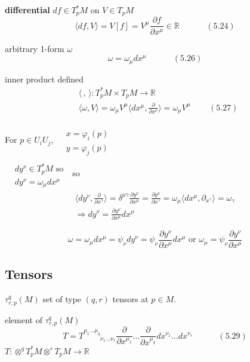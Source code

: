 \documentclass{book}
\begin{document}
\textbf{ differential } $df \in T_p^*M$ on $V \in T_pM$
\[
\langle df , V \rangle = V[f] = V^{\mu} \frac{ \partial f}{ \partial x^{\mu} } \in \mathbb{R} \quad \quad \quad \, (5.24)
\]

arbitrary 1-form $\omega$
\[
\omega = \omega_{\mu} dx^{\mu} \quad \quad \quad \, (5.26)
\]

inner product defined
\[
\begin{aligned}
  & \langle \, , \, \rangle : T_p^*M \times T_pM \to \mathbb{R} \\
  & \langle \omega, V \rangle = \omega_{\mu} V^{\mu} \langle dx^{\mu}, \frac{ \partial}{ \partial x^{\nu} } \rangle = \omega_{\mu} V^{\mu} \quad \quad \, (5.27) 
\end{aligned}
\]

For $p \in U_iU_j$, $\begin{aligned} & \quad \\ 
  & x = \varphi_i(p) \\ 
  & y = \varphi_j(p) \end{aligned}$ \\

$\begin{aligned}
  & \quad \\
  & dy^{\nu} \in T_p^*M \text{ so } \\
  & dy^{\nu} = \omega_{\mu} dx^{\mu} \end{aligned}$ so
\[
\begin{gathered}
\langle dy^{\nu} , \frac{ \partial }{ \partial x^{\gamma} } \rangle = \delta^{\mu \gamma} \frac{ \partial y^{\nu} }{ \partial x^{\mu} } = \frac{ \partial y^{\nu} }{ \partial x^{\gamma} } = \omega_{\mu} \langle dx^{\mu}, \partial_{x^{\gamma}} \rangle = \omega_{\gamma} \\
\Longrightarrow dy^{\nu} = \frac{ \partial y^{\nu} }{ \partial x^{\mu} } dx^{\mu} 
\end{gathered}
\]

\[
\omega = \omega_{\mu} dx^{\mu} = \psi_{\nu} dy^{\nu} = \psi_{\nu} \frac{ \partial y^{\nu}}{ \partial x^{\mu}  } dx^{\mu} \text{ or } \omega_{\mu} = \psi_{\nu} \frac{ \partial y^{\nu }}{ \partial x^{\mu}}
\]


\subsection{Tensors}

$\tau^q_{r, p }(M)$ set of type $(q,r)$ tensors at $p\in M$.  

element of $\tau^q_{r, p }(M)$
\[
T = T^{\mu_1 \dots \mu_q }_{\phantom{\mu_1 \dots \mu_q} \nu_1 \dots \nu_r } \frac{ \partial }{ \partial x^{\mu_1} } \dots \frac{ \partial}{ \partial x^{\mu_q} } dx^{\nu_1 } \dots dx^{\nu_r} \quad \quad \quad (5.29)
\]
$T: \otimes^q T_p^*M \otimes^r T_pM \to \mathbb{R}$
\end{document}
